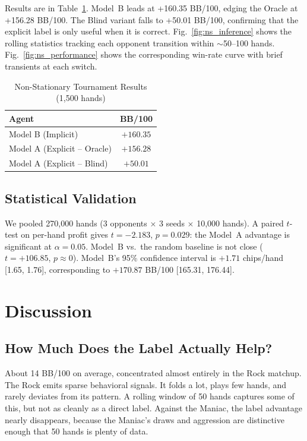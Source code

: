 \documentclass[11pt, conference]{IEEEtran}
\begin{document}
Results are in Table~\ref{tab:nonstationary}. Model~B leads at +160.35
BB/100, edging the Oracle at +156.28 BB/100. The Blind variant falls to
+50.01 BB/100, confirming that the explicit label is only useful when it
is correct. Fig.~\ref{fig:ns_inference} shows the rolling statistics
tracking each opponent transition within $\sim$50--100 hands.
Fig.~\ref{fig:ns_performance} shows the corresponding win-rate curve with
brief transients at each switch.

\begin{table}[htbp]
\caption{Non-Stationary Tournament Results (1,500 hands)}
\label{tab:nonstationary}
\centering
\begin{tabular}{lc}
\toprule
\textbf{Agent} & \textbf{BB/100} \\
\midrule
Model B (Implicit)           & $+160.35$ \\
Model A (Explicit -- Oracle) & $+156.28$ \\
Model A (Explicit -- Blind)  & $+50.01$  \\
\bottomrule
\end{tabular}
\end{table}

\subsection{Statistical Validation}

We pooled 270{,}000 hands (3 opponents $\times$ 3 seeds $\times$ 10{,}000
hands). A paired $t$-test on per-hand profit gives $t = -2.183$,
$p = 0.029$: the Model~A advantage is significant at $\alpha = 0.05$.
Model~B vs.\ the random baseline is not close ($t = +106.85$,
$p \approx 0$). Model~B's 95\% confidence interval is $+1.71$ chips/hand
[1.65, 1.76], corresponding to $+170.87$ BB/100 [165.31, 176.44].

\section{Discussion}
\label{sec:discussion}

\subsection{How Much Does the Label Actually Help?}

About 14 BB/100 on average, concentrated almost entirely in the Rock
matchup. The Rock emits sparse behavioral signals. It folds a lot, plays
few hands, and rarely deviates from its pattern. A rolling window of 50
hands captures some of this, but not as cleanly as a direct label. Against
the Maniac, the label advantage nearly disappears, because the Maniac's
draws and aggression are distinctive enough that 50 hands is plenty of
data.
\end{document}
